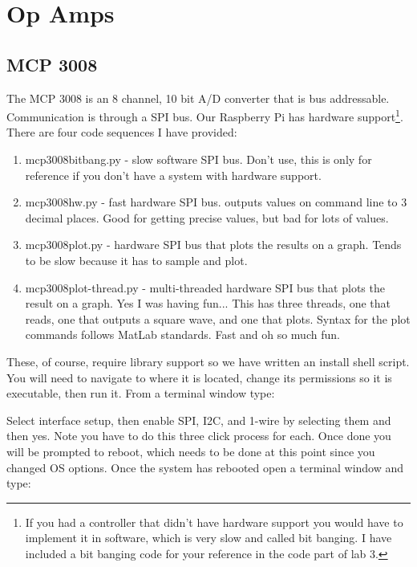 \chapter{Op Amps}

\section{MCP 3008}

The MCP 3008 is an 8 channel, 10 bit A/D converter that is bus addressable.  Communication is through a SPI bus.  Our Raspberry Pi has hardware support\footnote{If you had a controller that didn't have hardware support you would have to implement it in software, which is very slow and called bit banging.  I have included a bit banging code for your reference in the code part of lab 3.}.  There are four code sequences I have provided:
\begin{enumerate}
\item mcp3008bitbang.py - slow software SPI bus.  Don't use, this is only for reference if you don't have a system with hardware support.
\item mcp3008hw.py - fast hardware SPI bus.  outputs values on command line to 3 decimal places.  Good for getting precise values, but bad for lots of values.
\item mcp3008plot.py - hardware SPI bus that plots the results on a graph.  Tends to be slow because it has to sample and plot.
\item mcp3008plot-thread.py - multi-threaded hardware SPI bus that plots the result on a graph.  Yes I was having fun...  This has three threads, one that reads, one that outputs a square wave, and one that plots.  Syntax for the plot commands follows MatLab standards.  Fast and oh so much fun.
\end{enumerate}
These, of course, require library support so we have written an install shell script.  You will need to navigate to where it is located, change its permissions so it is executable, then run it.  From a terminal window type:


Select interface setup, then enable SPI, I2C, and 1-wire by selecting them and then yes.  Note you have to do this three click process for each.  Once done you will be prompted to reboot, which needs to be done at this point since you changed OS options.  Once the system has rebooted open a terminal window and type:



